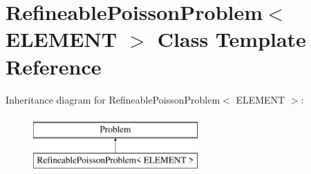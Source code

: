\hypertarget{classRefineablePoissonProblem}{}\section{Refineable\+Poisson\+Problem$<$ E\+L\+E\+M\+E\+NT $>$ Class Template Reference}
\label{classRefineablePoissonProblem}
Inheritance diagram for Refineable\+Poisson\+Problem$<$ E\+L\+E\+M\+E\+NT $>$\+:\begin{figure}[H]
\begin{center}
\leavevmode
\includegraphics[height=2.000000cm]{classRefineablePoissonProblem}
\end{center}
\end{figure}
